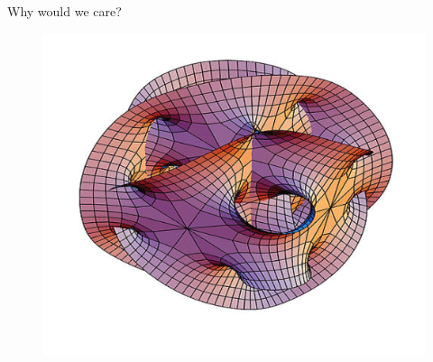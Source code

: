 \documentclass{beamer}
\theoremstyle{definition}
\begin{document}
\begin{frame}{Why would we care?}{}
\begin{itemize}
{{\begin{figure}
						\includegraphics[scale=0.2]{manifold4.png}
				\end{figure}}}
            \end{itemize}
	\end{frame}
\end{document}

